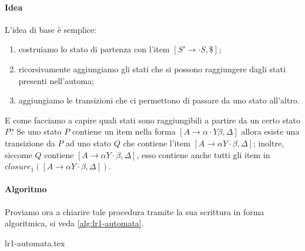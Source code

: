 \documentclass[class=book, crop=false, oneside, 12pt]{standalone}
\begin{document}
\paragraph{Idea}
L'idea di base è semplice:
\begin{enumerate}
    \item costruiamo lo stato di partenza con l'item \([S' \to \cdot S, {\$}]\);
    \item ricorsivamente aggiungiamo gli stati che si possono raggiungere dagli stati presenti nell'automa;
    \item aggiungiamo le transizioni che ci permettono di passare da uno stato all'altro.
\end{enumerate}
E come facciamo a capire quali stati sono raggiungibili a partire da un certo stato \(P\)? Se uno stato \(P\) contiene un item nella forma \([A \to \alpha \cdot Y \beta, \Delta]\) allora esiste una transizione da \(P\) ad uno stato \(Q\) che contiene l'item \([A \to \alpha Y \cdot \beta , \Delta]\); inoltre, siccome \(Q\) contiene \([A \to \alpha Y \cdot \beta , \Delta]\), esso contiene anche tutti gli item in \(closure_1([A \to \alpha Y \cdot \beta , \Delta])\).

\paragraph{Algoritmo}
Proviamo ora a chiarire tale procedura tramite la sua scrittura in forma algoritmica, si veda \ref{alg:lr1-automata}.

{lr1-automata.tex}
\end{document}
